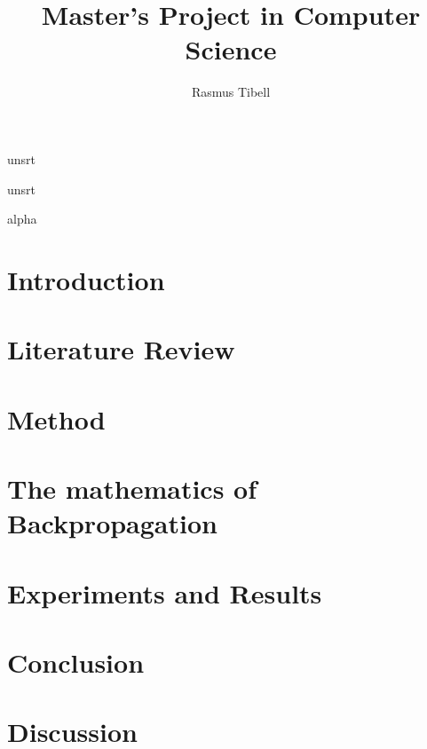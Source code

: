 \documentclass[a4paper]{article}
\author{Rasmus Tibell}
\title{Master's Project in Computer Science}
\begin{document}

{unsrt} 

{unsrt} 

{alpha} 

\maketitle


\pagebreak
\tableofcontents


\pagebreak
\section{Introduction}



\pagebreak
\section{Literature Review} \label{ss:literature_review}



\pagebreak
\section{Method}



\pagebreak
\section{The mathematics of Backpropagation}



\section{Experiments and Results} \label{ss:results}

 


\section{Conclusion}




\section{Discussion}

\end{document}
